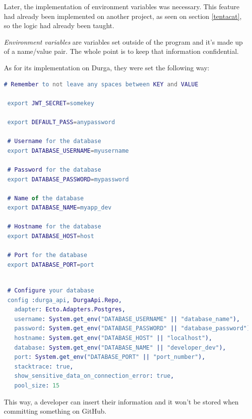 Later, the implementation of environment variables was necessary. This feature had already been implemented on another project, as seen on section \ref{tentacat}, so the logic had already been taught.\newline

\textit{Environment variables} are variables set outside of the program and it's made up of a name/value pair. The whole point is to keep that information confidential.\newline

As for its implementation on Durga, they were set the following way: \newline

\begin{lstlisting}[language=erlang, caption={Environment Variables Configuration on .env.sample}]
# Remember to not leave any spaces between KEY and VALUE

 export JWT_SECRET=somekey

 export DEFAULT_PASS=anypassword

 # Username for the database
 export DATABASE_USERNAME=myusername

 # Password for the database
 export DATABASE_PASSWORD=mypassword

 # Name of the database
 export DATABASE_NAME=myapp_dev

 # Hostname for the database
 export DATABASE_HOST=host

 # Port for the database
 export DATABASE_PORT=port
\end{lstlisting}

\begin{lstlisting}[language=erlang, caption={Database configuration on dev.exs}]

 # Configure your database
 config :durga_api, DurgaApi.Repo,
   adapter: Ecto.Adapters.Postgres,
   username: System.get_env("DATABASE_USERNAME" || "database_name"),
   password: System.get_env("DATABASE_PASSWORD" || "database_password"),
   hostname: System.get_env("DATABASE_HOST" || "localhost"),
   database: System.get_env("DATABASE_NAME" || "developer_dev"),
   port: System.get_env("DATABASE_PORT" || "port_number"),
   stacktrace: true,
   show_sensitive_data_on_connection_error: true,
   pool_size: 15
\end{lstlisting}

This way, a developer can insert their information and it won't be stored when committing something on GitHub.\newline

